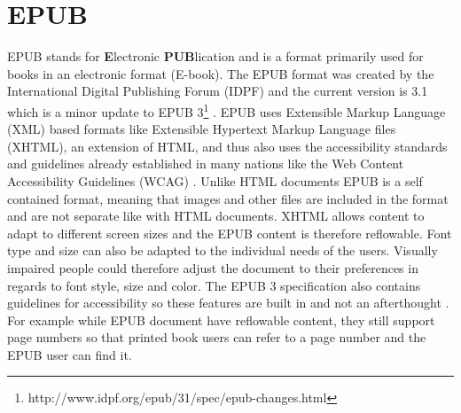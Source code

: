 \section{EPUB}
EPUB stands for {\bf E}lectronic {\bf PUB}lication and is a format primarily used for books in an electronic format (E-book). The EPUB format was created by the International Digital Publishing Forum (IDPF) and the current version is 3.1 which is a minor update to EPUB 3\footnote{http://www.idpf.org/epub/31/spec/epub-changes.html} \cite{EPUBspecs}. EPUB uses Extensible Markup Language (XML) based formats like Extensible Hypertext Markup Language files (XHTML), an extension of HTML, and thus also uses the accessibility standards and guidelines already established in many nations like the Web Content Accessibility Guidelines (WCAG) \cite{WCAG}. Unlike HTML documents EPUB is a self contained format, meaning that images and other files are included in the format and are not separate like with HTML documents. XHTML allows content to adapt to different screen sizes and the EPUB content is therefore reflowable. Font type and size can also be adapted to the individual needs of the users. Visually impaired people could therefore adjust the document to their preferences in regards to font style, size and color. The EPUB 3 specification also contains guidelines for accessibility so these features are built in and not an afterthought \cite{EPUB3bp}. For example while EPUB document have reflowable content, they still support page numbers so that printed book users can refer to a page number and the EPUB user can find it.






